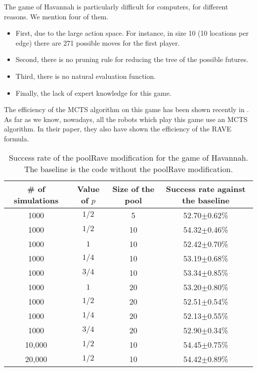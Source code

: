 \documentclass{llncs}
\begin{document}
The game of Havannah is particularly difficult for computers, for different reasons. We mention four of them.
\begin{itemize}
\item First, due to the large action space. For instance, in size 10 (10 locations per edge) there are 271 possible moves for the first player.
\item Second, there is no pruning rule for reducing the tree of the possible futures.
\item Third, there is no natural evaluation function.
\item Finally, the lack of expert knowledge for this game.
\end{itemize}
The efficiency of the MCTS algorithm on this game has been shown recently in \cite{fabienHavannah}. As far as we know, nowadays, all the robots which play this game use an MCTS algorithm. In their paper, they also have shown the efficiency of the RAVE formula.



\begin{table}
\begin{tabular}{|c|c|c|c|}
\hline
 \# of simulations & Value of $p$ & Size of the pool & Success rate against the baseline \\
\hline

1000 & $1/2$ & 5 & 52.70$\pm$0.62\% \\
1000 & $1/2$ & 10 & 54.32$\pm$0.46\% \\
1000 & $          1$ & 10 & 52.42$\pm$0.70\% \\
1000 & $1/4$ & 10 & 53.19$\pm$0.68\% \\
1000 & $3/4$ & 10 & 53.34$\pm$0.85\% \\
1000 & $          1$ & 20 & 53.20$\pm$0.80\% \\
1000 & $1/2$ & 20 & 52.51$\pm$0.54\% \\
1000 & $1/4$ & 20 & 52.13$\pm$0.55\% \\
1000 & $3/4$ & 20 & 52.90$\pm$0.34\% \\
10,000 & $1/2$ & 10 & 54.45$\pm$0.75\% \\
20,000 & $1/2$ & 10 & 54.42$\pm$0.89\% \\


\hline
\end{tabular}
\caption{\label{hav1000}Success rate of the poolRave modification for the game of Havannah. The baseline is the code without the poolRave modification.}
\end{table}
\end{document}
